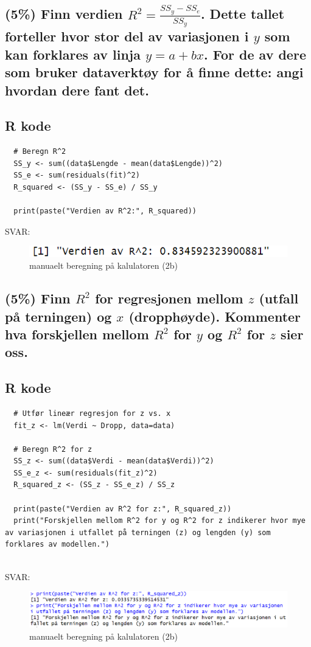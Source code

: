 \documentclass[12pt]{article}
\begin{document}
\subsection{(5\%) Finn verdien $R^2 = \frac{SS_y - SS_e}{SS_y}$. Dette tallet forteller hvor stor del av variasjonen i $y$ som kan forklares av linja $y = a + bx$. For de av dere som bruker dataverktøy for å finne dette: angi hvordan dere fant det.}
\subsection{R kode}
\begin{verbatim}
  # Beregn R^2
  SS_y <- sum((data$Lengde - mean(data$Lengde))^2)
  SS_e <- sum(residuals(fit)^2)
  R_squared <- (SS_y - SS_e) / SS_y
  
  print(paste("Verdien av R^2:", R_squared)) 
\end{verbatim} 
SVAR:
\begin{figure}[H]
  \centering
  \includegraphics[width=1\textwidth]{3g.png}
  \caption{manuaelt beregning på kalulatoren (2b)}
\end{figure}


\subsection{(5\%) Finn $R^2$ for regresjonen mellom $z$ (utfall på terningen) og $x$ (dropphøyde). Kommenter hva forskjellen mellom $R^2$ for $y$ og $R^2$ for $z$ sier oss.}
\subsection{R kode}
\begin{verbatim}
  # Utfør lineær regresjon for z vs. x
  fit_z <- lm(Verdi ~ Dropp, data=data)
  
  # Beregn R^2 for z
  SS_z <- sum((data$Verdi - mean(data$Verdi))^2)
  SS_e_z <- sum(residuals(fit_z)^2)
  R_squared_z <- (SS_z - SS_e_z) / SS_z
  
  print(paste("Verdien av R^2 for z:", R_squared_z))
  print("Forskjellen mellom R^2 for y og R^2 for z indikerer hvor mye av variasjonen i utfallet på terningen (z) og lengden (y) som forklares av modellen.")
  
\end{verbatim} 
SVAR:
\begin{figure}[H]
  \centering
  \includegraphics[width=1\textwidth]{3i.png}
  \caption{manuaelt beregning på kalulatoren (2b)}
\end{figure}
\end{document}

